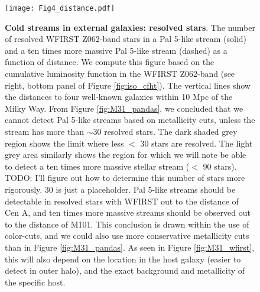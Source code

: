 \documentclass[twocolumn]{aastex62}
\newcommand{\todo}[1]{{\color{red} TODO: #1}}
\begin{document}
\begin{figure}
\centerline{\texttt{[image: Fig4\_distance.pdf]}}
\caption{{\bf Cold streams in external galaxies: resolved stars}. The number of resolved WFIRST Z062-band stars in a Pal 5-like stream (solid) and a ten times more massive Pal 5-like stream (dashed) as a function of distance. We compute this figure based on the cumulative luminosity function in the WFIRST Z062-band (see right, bottom panel of Figure \ref{fig:iso_cfht}). The vertical lines show the distances to four well-known galaxies within 10 Mpc of the Milky Way. From Figure \ref{fig:M31_pandas}, we concluded that we cannot detect Pal 5-like streams based on metallicity cuts, unless the stream has more than $\sim 30$ resolved stars. The dark shaded grey region shows the limit where less $<$ 30 stars are resolved. The light grey area similarly shows the region for which we will note be able to detect a ten times more massive stellar stream ($<$ 90 stars). \todo{I'll figure out how to determine this number of stars more rigorously. 30 is just a placeholder}.
Pal 5-like streams should be detectable in resolved stars with WFIRST out to the distance of Cen A, and ten times more massive streams should be observed out to the distance of M101. This conclusion is drawn within the use of color-cuts, and we could also use more conservative metallicity cuts than in Figure \ref{fig:M31_pandas}. As seen in Figure \ref{fig:M31_wfirst}, this will also depend on the location in the host galaxy (easier to detect in outer halo), and the exact background and metallicity of the specific host.}
\label{fig:distance}
\end{figure}
\end{document}
